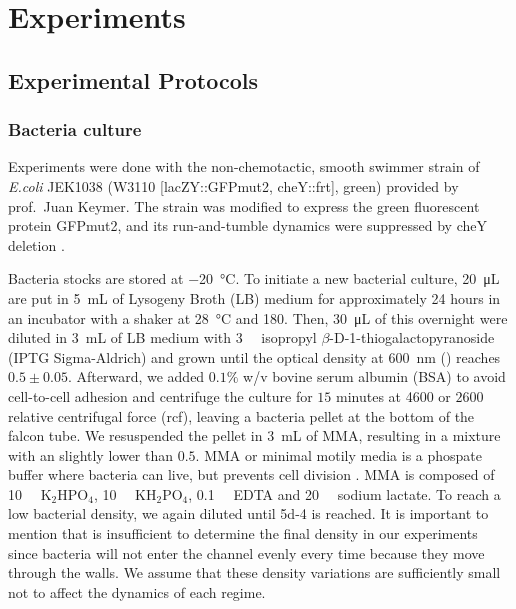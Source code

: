 \chapter{Experiments}

\section{Experimental Protocols}
\subsection{Bacteria culture}

Experiments were done with the non-chemotactic, smooth swimmer strain of \textit{E.coli} JEK1038 (W3110 [lacZY::GFPmut2, cheY::frt], green) provided by prof.\ Juan Keymer. The strain was modified to express the green fluorescent protein GFPmut2, and its run-and-tumble dynamics were suppressed by cheY deletion \cite{VanVliet2014ThePopulations}. 

Bacteria stocks are stored at \SI{-20}{\degreeCelsius}. To initiate a new bacterial culture, \SI{20}{\micro\liter} are put in \SI{5}{\milli\liter} of Lysogeny Broth (LB) medium for approximately 24 hours in an incubator with a shaker at \SI{28}{\degreeCelsius} and \SI{180}{\rpm}. Then, \SI{30}{\micro\liter} of this overnight were diluted in \SI{3}{\milli\liter} of LB medium with \SI{3}{\milli\molar} isopropyl $\beta$-D-1-thiogalactopyranoside (IPTG Sigma-Aldrich) and grown until the optical density at \SI{600}{\nano\meter} (\SI{}{\OD}) reaches $0.5\pm0.05$. Afterward, we added $0.1\%$ w/v bovine serum albumin (BSA) to avoid cell-to-cell adhesion and centrifuge the culture for $15$ minutes at \SI{4600}{\rpm} or $2600$ relative centrifugal force (rcf), leaving a bacteria pellet at the bottom of the falcon tube. We resuspended the pellet in \SI{3}{\milli\liter} of MMA, resulting in a mixture with an \SI{}{\OD} slightly lower than $0.5$. MMA or minimal motily media is a phospate buffer where bacteria can live, but prevents cell division \cite{Altshuler2013Flow-controlledConstriction}. MMA is composed of \SI{10}{\milli\molar} K$_2$HPO$_4$, \SI{10}{\milli\molar} KH$_2$PO$_4$, \SI{0.1}{\milli\molar} EDTA and \SI{20}{\micro\molar} sodium lactate. To reach a low bacterial density, we again diluted until \SI{5d-4}{\OD} is reached. It is important to mention that \SI{}{\OD} is insufficient to determine the final density in our experiments since bacteria will not enter the channel evenly every time because they move through the walls. We assume that these density variations are sufficiently small not to affect the dynamics of each regime.


